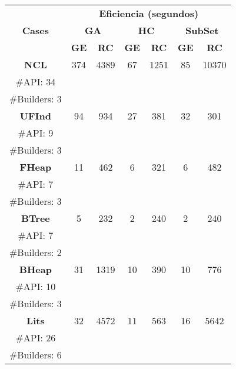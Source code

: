 \begin{table}[H]
\centering
\label{tab:t1}
\scriptsize
\begin{tabular}{|c c|cc|cc|cc|}
\midrule
\multicolumn{2}{|c|}{\multirow{3}{*}{\textbf{Cases}}} & \multicolumn{6}{c|}{\textbf{Eficiencia (segundos)}} \\
\cline{3-8}
\multicolumn{2}{|c|}{} & \multicolumn{2}{c}{\textbf{GA}} & \multicolumn{2}{c}{\textbf{HC}} & \multicolumn{2}{c|}{\textbf{SubSet}} \\
\multicolumn{2}{|c|}{} & \textbf{\tiny{GE}} & \textbf{\tiny{RC}} & \textbf{\tiny{GE}} & \textbf{\tiny{RC}} & \textbf{\tiny{GE}} & \textbf{\tiny{RC}} \\
\midrule
\multicolumn{2}{|c|}{\textbf{NCL}} & 374  & 4389   & 67 &  1251 &85 & 10370 \\
\multicolumn{2}{|c|}{\tiny \#API: 34} &  &   & &   & & \\
\multicolumn{2}{|c|}{\tiny \#Builders: 3} &  &   & &   & & \\
\midrule
\multicolumn{2}{|c|}{\textbf{UFInd}}& 94  & 934  &  27 &381   & 32  &  301    \\
\multicolumn{2}{|c|}{\tiny \#API: 9} &  &   & &   & & \\
\multicolumn{2}{|c|}{\tiny \#Builders: 3} &  &   & &   & & \\
\midrule
\multicolumn{2}{|c|}{\textbf{FHeap}} & 11  & 462  & 6  &321   &  6 &  482   \\
\multicolumn{2}{|c|}{\tiny \#API: 7} &  &   & &   & & \\
\multicolumn{2}{|c|}{\tiny \#Builders: 3} &  &   & &   & & \\
\midrule
\multicolumn{2}{|c|}{\textbf{BTree}} &  5 &  232 & 2  & 240   &  2 & 240   \\
\multicolumn{2}{|c|}{\tiny \#API: 7} &  &   & &   & & \\
\multicolumn{2}{|c|}{\tiny \#Builders: 2} &  &   & &   & & \\
\midrule
\multicolumn{2}{|c|}{\textbf{BHeap}} & 31 &  1319 & 10 & 390  & 10 &  776   \\
\multicolumn{2}{|c|}{\tiny \#API: 10} &  &   & &   & & \\
\multicolumn{2}{|c|}{\tiny \#Builders: 3} &  &   & &   & & \\
\midrule
\multicolumn{2}{|c|}{\textbf{Lits}} & 32  & 4572  & 11  &  563 & 16  & 5642   \\
\multicolumn{2}{|c|}{\tiny \#API: 26} &  &   & &   & & \\
\multicolumn{2}{|c|}{\tiny \#Builders: 6} &  &   & &   & & \\

\end{tabular}
\end{table}
